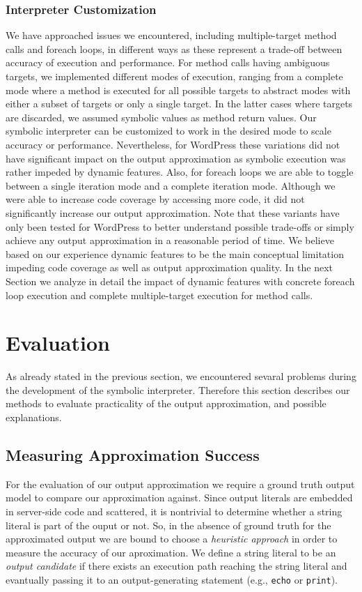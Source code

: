 \documentclass[sigconf]{acmart}
\renewcommand{\sf}[1]{\textsf{#1}}
\begin{document}
\subsubsection{Interpreter Customization}
We have approached issues we encountered, including
multiple-target method calls and foreach loops, in different ways as these
represent a trade-off between accuracy of execution and performance.
For method calls having ambiguous targets, we implemented different modes of
execution, ranging from a complete mode where a method is executed for all
possible targets to abstract modes with either a subset of targets or only a
single target. In the latter cases where targets are discarded, we assumed
symbolic values as method return values. Our symbolic interpreter can be
customized to work in the desired mode to scale accuracy or performance.
Nevertheless, for \sf{WordPress} these variations did not have significant
impact on the output approximation as symbolic execution was rather impeded by
dynamic features.
Also, for foreach loops we are able to toggle between a single iteration mode
and a complete iteration mode. Although we were able to increase code coverage
by accessing more code, it did not significantly increase our output
approximation.
Note that these variants have only been tested for \sf{WordPress} to better
understand possible trade-offs or simply achieve any output approximation in a
reasonable period of time. We believe based on our experience dynamic features
to be the main conceptual limitation impeding code coverage as well as output
approximation quality. In the next Section we analyze in detail the impact of
dynamic features with concrete foreach loop execution and complete
multiple-target execution for method calls.


\section{Evaluation}
As already stated in the previous section, we encountered sevaral problems
during the development of the symbolic interpreter. Therefore this section
describes our methods to evaluate practicality of the output approximation, and
possible explanations.

\subsection{Measuring Approximation Success} \label{heuristic}
For the evaluation of our output approximation we require a ground truth output
model to compare our approximation against. Since output literals are embedded
in server-side code and scattered, it is nontrivial to determine whether a
string literal is part of the ouput or not. So, in the absence of ground truth
for the approximated output we are bound to choose a \emph{heuristic approach}
in order to measure the accuracy of our aproximation. We define a string
literal to be an \emph{output candidate} if there exists an execution path
reaching the string literal and evantually passing it to an output-generating
statement (e.g., \texttt{echo} or \texttt{print}).
\end{document}
